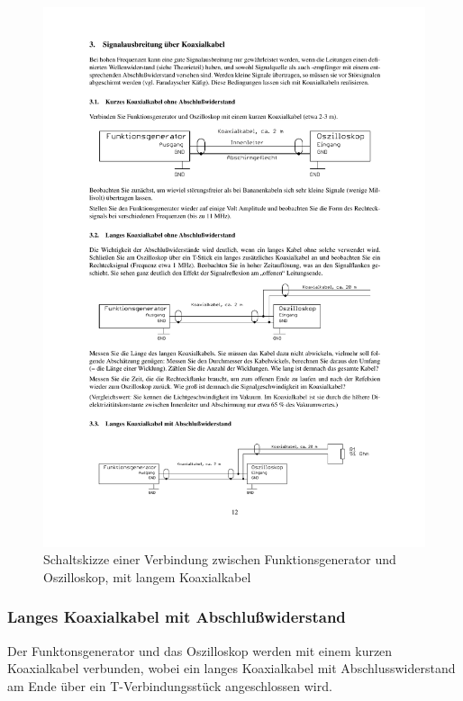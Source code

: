 \documentclass[12pt,a4paper]{article}
\begin{document}
\begin{figure}[H] 
  \centering
    \includegraphics[trim = 10mm 110mm 10mm 150mm, clip, scale = 1]{3-3_3.pdf}
  	\caption[Schaltskizze einer Verbindung zwischen Funktionsgenerator und Oszilloskop, mit langem Koaxialkabel]{Schaltskizze einer Verbindung zwischen Funktionsgenerator und Oszilloskop, mit langem Koaxialkabel\footnotemark}
  \label{fig:3.2}
\end{figure}

\subsubsection{Langes Koaxialkabel mit Abschlußwiderstand}

Der Funktonsgenerator und das Oszilloskop werden mit einem kurzen Koaxialkabel verbunden, wobei ein langes Koaxialkabel mit Abschlusswiderstand am Ende über ein T-Verbindungsstück angeschlossen wird.
\end{document}
